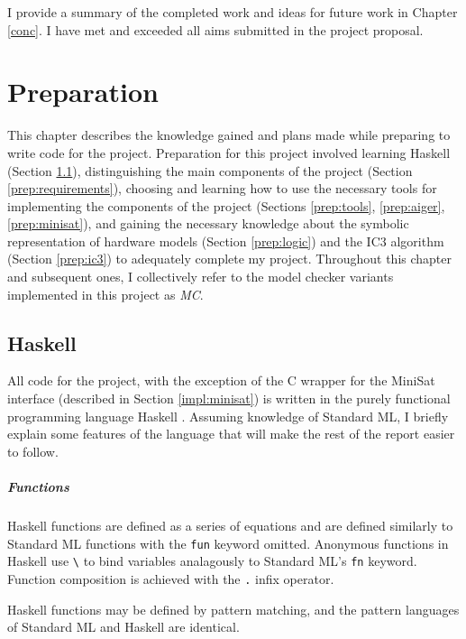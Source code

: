 \documentclass[12pt,a4paper,twoside,openright]{report}
\begin{document}
I provide a summary of the completed work and ideas for
future work in Chapter \ref{conc}. %
I have met and exceeded all aims submitted in the project proposal.

\chapter{Preparation}
\label{prep}

This chapter describes the knowledge gained and plans made while preparing
to write code for the project.
Preparation for this project involved learning
Haskell (Section \ref{prep:haskell}),
distinguishing the main components of the project
(Section \ref{prep:requirements}), choosing and learning how to use
the necessary tools for implementing the components of the project
(Sections \ref{prep:tools}, \ref{prep:aiger}, \ref{prep:minisat}),
and gaining the necessary knowledge about the symbolic representation
of hardware models
(Section \ref{prep:logic}) and the IC3 algorithm (Section \ref{prep:ic3}) to
adequately complete my project.
Throughout this chapter and subsequent ones, I collectively refer to the model checker
variants implemented in this project as \emph{MC}.

\section{Haskell}
\label{prep:haskell}

All code for the project, with the exception of the C wrapper for the
MiniSat interface (described in Section \ref{impl:minisat})
is written in the purely functional
programming language Haskell \cite{haskell}.
Assuming knowledge of Standard ML, I briefly explain some features of the
language that will make the rest of the report easier to follow.

\paragraph{Functions}{
Haskell functions are defined as a series of equations and
are defined similarly to Standard ML functions with the
\verb,fun, keyword omitted. Anonymous functions in Haskell
use \verb,\, to bind variables analagously to Standard
ML's \verb,fn, keyword. Function composition is achieved with the \verb,., infix operator.

Haskell functions may be defined  by pattern matching, and the pattern languages of Standard
ML and Haskell are identical.
}
\end{document}
